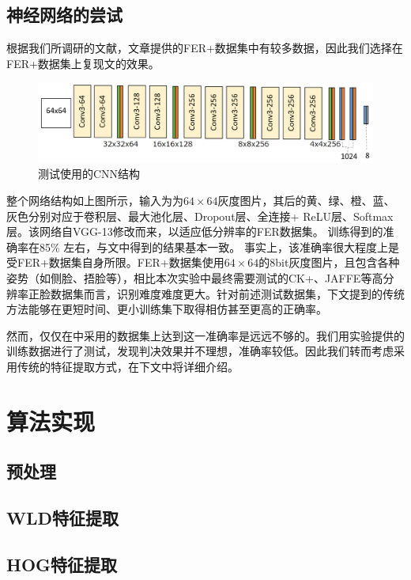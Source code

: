 \documentclass[UTF8]{ctexart}
\begin{document}
\subsection{神经网络的尝试}
根据我们所调研的文献，文章\cite{BarsoumICMI2016}提供的FER+数据集中有较多数据，因此我们选择在FER+数据集上复现文\cite{BarsoumICMI2016}的效果。

\begin{figure}[ht]
  \includegraphics[width=\textwidth]{ferplus.png}
  \caption{测试使用的CNN结构}\label{fig:ferplus}
\end{figure}

整个网络结构如上图所示，输入为为$64\times 64$灰度图片，其后的黄、绿、橙、蓝、灰色分别对应于卷积层、最大池化层、Dropout层、全连接+ ReLU层、Softmax层。该网络自VGG-13修改而来，以适应低分辨率的FER数据集。
训练得到的准确率在85\% 左右，与文中得到的结果基本一致。
事实上，该准确率很大程度上是受FER+数据集自身所限。FER+数据集使用$64\times 64$的8bit灰度图片，且包含各种姿势（如侧脸、捂脸等），相比本次实验中最终需要测试的CK+、JAFFE等高分辨率正脸数据集而言，识别难度难度更大。针对前述测试数据集，下文提到的传统方法能够在更短时间、更小训练集下取得相仿甚至更高的正确率。

然而，仅仅在\cite{BarsoumICMI2016}中采用的数据集上达到这一准确率是远远不够的。我们用实验提供的训练数据进行了测试，发现判决效果并不理想，准确率较低。因此我们转而考虑采用传统的特征提取方式，在下文中将详细介绍。

\section{算法实现}

\subsection{预处理}


\subsection{WLD特征提取}

\subsection{HOG特征提取}
\end{document}
